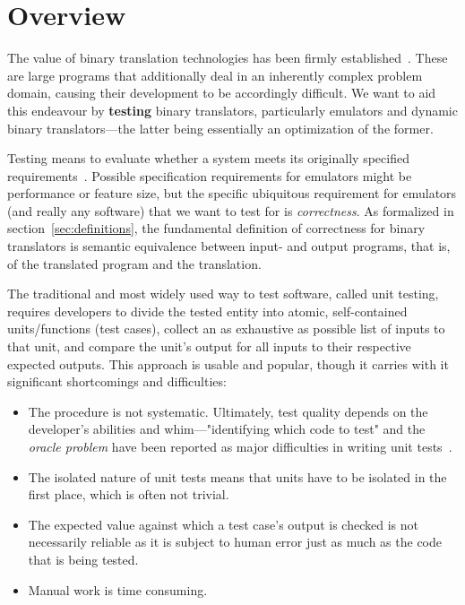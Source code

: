 \chapter{Overview}\label{chapter:overview}

The value of binary translation technologies has been firmly established~\cite{altman2000welcome, sites1993binary,
probst2002dynamic}. These are large programs that additionally deal in an inherently complex problem domain, causing
their development to be accordingly difficult. We want to aid this endeavour by \textbf{testing} binary translators,
particularly emulators and dynamic binary translators---the latter being essentially an optimization of the former.

Testing means to evaluate whether a system meets its originally specified requirements~\cite{jamil2016software_testing}.
Possible specification requirements for emulators might be performance or feature size, but the specific ubiquitous
requirement for emulators (and really any software) that we want to test for is \textit{correctness}. As formalized in
section~\ref{sec:definitions}, the fundamental definition of correctness for binary translators is semantic equivalence
between input- and output programs, that is, of the translated program and the translation.

The traditional and most widely used way to test software, called unit testing, requires developers to divide the tested
entity into atomic, self-contained units/functions (test cases), collect an as exhaustive as possible list of inputs to
that unit, and compare the unit's output for all inputs to their respective expected outputs. This approach is usable
and popular, though it carries with it significant shortcomings and difficulties:

\begin{itemize}
    \item The procedure is not systematic. Ultimately, test quality depends on the developer's abilities and
        whim---"identifying which code to test" and the \textit{oracle problem} have been reported as major
        difficulties in writing unit tests~\cite{Daka+2014UnitTestingSurvey}.
    \item The isolated nature of unit tests means that units have to be isolated in the first place, which is often not
        trivial.
    \item The expected value against which a test case's output is checked is not necessarily reliable as it is subject
        to human error just as much as the code that is being tested.
    \item Manual work is time consuming.
\end{itemize}

